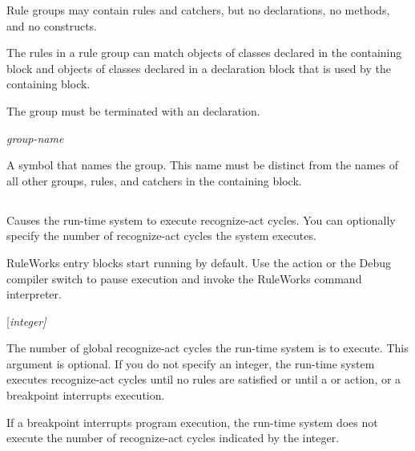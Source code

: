 {{Rule groups may contain rules and catchers, but no declarations, no
methods, and no  constructs.

The rules in a rule group can match objects of classes declared in the
containing block and objects of classes declared in a declaration
block that is used by the containing block.

The group must be terminated with an  declaration.

\Format

 \it{group-name}

\begin{argument}
\item[group-name]

  A symbol that names the group. This name must be distinct from the
  names of all other groups, rules, and catchers in the containing
  block.
\end{argument}

\subsection{}

Causes the run-time system to execute recognize-act cycles.  You can
optionally specify the number of recognize-act cycles the system
executes.

RuleWorks entry blocks start running by default. Use the 
action or the Debug compiler switch to pause execution and invoke the
RuleWorks command interpreter.

\Format

 [\it{integer}]

\begin{argument}
\item[integer]

  The number of global recognize-act cycles the run-time system is to
  execute. This argument is optional. If you do not specify an
  integer, the run-time system executes recognize-act cycles until no
  rules are satisfied or until a  or  action, or a
  breakpoint interrupts execution.
\end{argument}

\begin{note}
  If a breakpoint interrupts program execution, the run-time
  system does not execute the number of recognize-act cycles indicated
  by the integer.
\end{note}

\Example

}}
